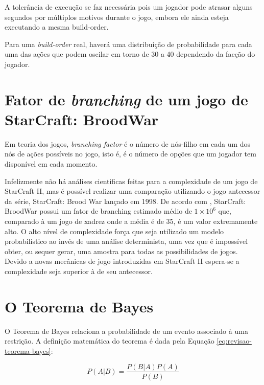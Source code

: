 A tolerância de execução se faz necessária pois um jogador pode atrasar alguns segundos por múltiplos motivos durante o jogo, embora ele ainda esteja executando a mesma build-order.

Para uma \textit{\gls{build-order}} real, haverá uma distribuição de probabilidade para cada uma das ações que podem oscilar em torno de 30 a 40 dependendo da facção do jogador.

		\section{Fator de \textit{branching} de um jogo de StarCraft: BroodWar}
Em teoria dos jogos, \textit{branching factor} é o número de nós-filho em cada um dos nós de ações possíveis no jogo, isto é, é o número de opções que um jogador tem disponível em cada momento.

Infelizmente não há análises cientificas feitas para a complexidade de um jogo de StarCraft II, mas é possível realizar uma comparação utilizando o jogo antecessor da série, StarCraft: Brood War lançado em 1998. De acordo com \cite{weber2009data}, StarCraft: BroodWar possui um fator de branching estimado médio de $1 \times 10^6$ que, comparado à um jogo de xadrez onde a média é de 35, é um valor extremamente alto. O alto nível de complexidade força que seja utilizado um modelo probabilístico ao invés de uma análise determinista, uma vez que é impossível obter, ou sequer gerar, uma amostra para todas as possibilidades de jogos. Devido a novas mecânicas de jogo introduzidas em StarCraft II espera-se a complexidade seja superior à de seu antecessor.

		\section{O Teorema de Bayes}
O Teorema de Bayes relaciona a probabilidade de um evento associado à uma restrição. A definição matemática do teorema é dada pela Equação \ref{eq:revisao-teorema-bayes}:

\begin{equation}
	P(A|B) = \frac{P(B|A)P(A)}{P(B)}
	\label{eq:revisao-teorema-bayes}
\end{equation}

